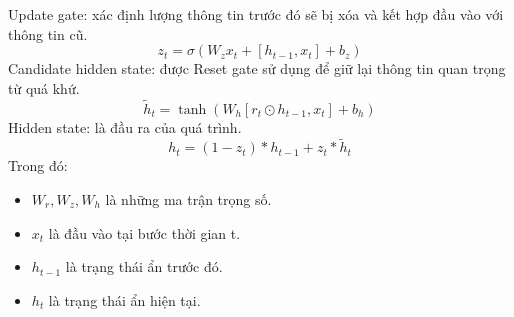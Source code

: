 \documentclass[conference]{IEEEtran}
\begin{document}
Update gate: xác định lượng thông tin trước đó sẽ bị xóa và kết hợp đầu vào với thông tin cũ.
\[z_t = \sigma(W_z x_t + [h_{t-1}, x_t] + b_z)\]
Candidate hidden state: được Reset gate sử dụng để giữ lại thông tin quan trọng từ quá khứ.
\[\tilde{h}_t = \tanh(W_h [r_t \odot h_{t-1}, x_t] + b_h)\]
Hidden state: là đầu ra của quá trình.
\[h_t = (1 - z_t) * h_{t-1} + z_t * \tilde{h}_t\]
Trong đó:
\begin{itemize}
    \item $W_r, W_z, W_h$ là những ma trận trọng số.
    \item $x_t$ là đầu vào tại bước thời gian t.
    \item $h_{t-1}$ là trạng thái ẩn trước đó.
    \item $h_t$ là trạng thái ẩn hiện tại.
\end{itemize}
\end{document}
